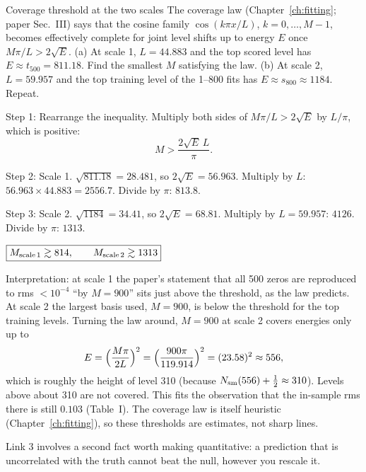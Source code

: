 \begin{sample}{Coverage threshold at the two scales}
The coverage law (Chapter~\ref{ch:fitting}; paper Sec.~III) says that the cosine family $\cos(k\pi x/L)$, $k=0,\dots,M-1$, becomes effectively complete for joint level shifts up to energy $E$ once $M\pi/L>2\sqrt{E}$. (a) At scale 1, $L=44.883$ and the top scored level has $E\approx t_{500}=811.18$. Find the smallest $M$ satisfying the law. (b) At scale 2, $L=59.957$ and the top training level of the 1--800 fits has $E\approx s_{800}\approx1184$. Repeat.

Step 1: Rearrange the inequality. Multiply both sides of $M\pi/L>2\sqrt E$ by $L/\pi$, which is positive:
\[
M>\frac{2\sqrt{E}\,L}{\pi}.
\]

Step 2: Scale 1. $\sqrt{811.18}=28.481$, so $2\sqrt E=56.963$. Multiply by $L$: $56.963\times44.883=2556.7$. Divide by $\pi$: $813.8$.

Step 3: Scale 2. $\sqrt{1184}=34.41$, so $2\sqrt E=68.81$. Multiply by $L=59.957$: $4126$. Divide by $\pi$: $1313$.

$\boxed{M_{\rm scale\,1}\gtrsim 814,\qquad M_{\rm scale\,2}\gtrsim 1313}$

Interpretation: at scale 1 the paper's statement that all 500 zeros are reproduced to rms $<10^{-4}$ ``by $M=900$'' sits just above the threshold, as the law predicts. At scale 2 the largest basis used, $M=900$, is below the threshold for the top training levels. Turning the law around, $M=900$ at scale 2 covers energies only up to
\[
E=\Bigl(\frac{M\pi}{2L}\Bigr)^2=\Bigl(\frac{900\pi}{119.914}\Bigr)^2=(23.58)^2\approx556,
\]
which is roughly the height of level 310 (because $N_{\mathrm{sm}}(556)+\tfrac12\approx310$). Levels above about 310 are not covered. This fits the observation that the in-sample rms there is still $0.103$ (Table~I). The coverage law is itself heuristic (Chapter~\ref{ch:fitting}), so these thresholds are estimates, not sharp lines.
\end{sample}

Link 3 involves a second fact worth making quantitative: a prediction that is uncorrelated with the truth cannot beat the null, however you rescale it.

